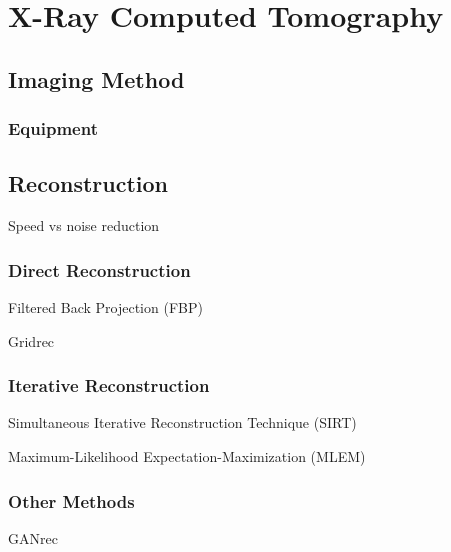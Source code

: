 \chapter{X-Ray Computed Tomography}
\label{sec:ct}
\section{Imaging Method}
\subsection{Equipment}
\section{Reconstruction}
Speed vs noise reduction
\subsection{Direct Reconstruction}
Filtered Back Projection (FBP)

Gridrec
\subsection{Iterative Reconstruction}
Simultaneous Iterative Reconstruction Technique (SIRT)

Maximum-Likelihood Expectation-Maximization (MLEM)
\subsection{Other Methods}
GANrec